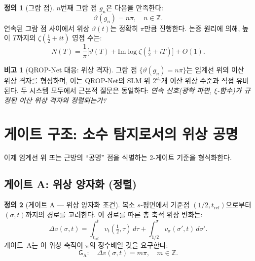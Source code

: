 \documentclass[11pt, a4paper]{article}
\theoremstyle{definition}
\newtheorem{definition}{정의}[section]
\newtheorem{remark}{비고}[section]
\theoremstyle{plain}
\newcommand{\xif}{\xi}
\newcommand{\GateA}{\mathsf{G}_{\mathrm{A}}}
\begin{document}
\begin{definition}[그람 점]
\label{def:gram}
$n$번째 그람 점 $g_n$은 다음을 만족한다:
\begin{equation}
  \vartheta(g_n) = n\pi, \quad n \in \mathbb{Z}.
  \label{eq:gram_points}
\end{equation}
연속된 그람 점 사이에서 위상 $\vartheta(t)$는 정확히 $\pi$만큼 진행한다. 논증 원리에 의해, 높이 $T$까지의 $\zeta(\tfrac{1}{2}+it)$ 영점 수는:
\begin{equation}
  N(T) = \frac{1}{\pi}\Big[\vartheta(T) +
  \mathrm{Im}\log\zeta(\tfrac{1}{2}+iT)\Big] + O(1).
  \label{eq:zero_counting}
\end{equation}
\end{definition}

\begin{remark}[QROP-Net 대응: 위상 격자]
\label{rem:gram_grid}
그람 점 $\{\vartheta(g_n) = n\pi\}$는 임계선 위의 이산 위상 격자를 형성하며, 이는 QROP-Net의 SLM 위 $2^{d_u}$개 이산 위상 수준과 직접 유비된다. 두 시스템 모두에서 근본적 질문은 동일하다: \textit{연속 신호(광학 파면, $\xif$-함수)가 규정된 이산 위상 격자와 정렬되는가?}
\end{remark}


\section{게이트 구조: 소수 탐지로서의 위상 공명}
\label{sec:gates}

이제 임계선 위 또는 근방의 ``공명'' 점을 식별하는 2-게이트 기준을 형식화한다.

\subsection{게이트 A: 위상 양자화 (정렬)}

\begin{definition}[게이트 A --- 위상 양자화 조건]
\label{def:gate_a}
복소 $s$-평면에서 기준점 $(1/2, t_{\mathrm{ref}})$으로부터 $(\sigma, t)$까지의 경로를 고려한다. 이 경로를 따른 총 축적 위상 변화는:
\begin{equation}
  \Delta v(\sigma, t) = \int_{t_{\mathrm{ref}}}^{t}
  v_t(\tfrac{1}{2}, \tau)\,d\tau +
  \int_{1/2}^{\sigma}v_\sigma(\sigma', t)\,d\sigma'.
  \label{eq:phase_accumulation}
\end{equation}
게이트~A는 이 위상 축적이 $\pi$의 정수배일 것을 요구한다:
\begin{equation}
\boxed{
  \GateA: \quad \Delta v(\sigma, t) = m\pi, \quad m \in \mathbb{Z}.
}
\label{eq:gate_a}
\end{equation}
\end{definition}
\end{document}
